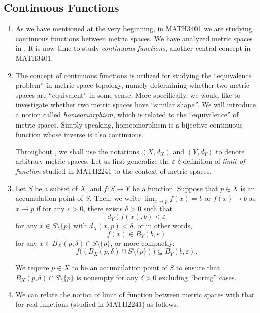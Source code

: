 \subsection{Continuous Functions}
\label{subsect:cts-fun}
\begin{enumerate}
\item As we have mentioned at the very beginning, in MATH3401 we are studying
continuous functions between metric spaces. We have analyzed metric spaces in
. It is now time to study \emph{continuous functions},
another central concept in MATH3401.

\item The concept of continuous functions is utilized for studying the
``equivalence problem'' in metric space topology, namely determining whether
two metric spaces are ``equivalent'' in some sense. More specifically, we would
like to investigate whether two metric spaces have ``similar shape''. We will
introduce a notion called \emph{homeomorphism}, which is related to the
``equivalence'' of metric spaces. Simply speaking, homeomorphism is a bijective
continuous function whose inverse is also continuous.

Throughout , we shall use the notations \((X,d_{X})\) and
\((Y,d_Y)\) to denote arbitrary metric spaces. Let us first generalize the
\(\varepsilon\)-\(\delta\) definition of \emph{limit of function} studied in
MATH2241 to the context of metric spaces.

\item Let \(S\) be a subset of \(X\), and \(f:S\to Y\) be a function. Suppose
that \(p\in X\) is an accumulation point of \(S\). Then, we write
\(\lim_{x\to p}f(x)=b\) or \(f(x)\to b\) as \(x\to p\) if for any
\(\varepsilon>0\), there exists \(\delta>0\) such that
\[
d_Y(f(x),b)<\varepsilon
\]
for any \(x\in S\setminus\{p\}\) with \(d_X(x,p)<\delta\), or in other words,
\[
f(x)\in B_Y(b,\varepsilon)
\]
for any \(x\in B_X(p,\delta)\cap S\setminus \{p\}\), or more compactly:
\[
f\big((B_X(p,\delta)\cap S\setminus \{p\})\big)\subseteq B_Y(b,\varepsilon).
\]
\begin{note}
We require \(p\in X\) to be an accumulation point of \(S\) to ensure that
\(B_X(p,\delta)\cap S\setminus \{p\}\) is nonempty for any \(\delta>0\)
 excluding ``boring'' cases.
\end{note}

\item \label{it:ms-lim-fun-relate-real-lim-fun} We can relate the notion of
limit of function between metric spaces with that for real functions
(studied in MATH2241) as follows.


\end{enumerate}
